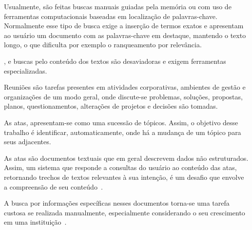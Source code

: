 






Usualmente, são feitas buscas manuais guiadas pela memória ou com uso de ferramentas computacionais baseadas em localização de palavras-chave. Normalmente esse tipo de busca exige a inserção de termos exatos e apresentam ao usuário um documento com as palavras-chave em destaque, mantendo o texto longo, o que dificulta por exemplo o ranqueamento por relevância. 


, e buscas pelo conteúdo dos textos são desaviadoras e exigem ferramentas especializadas.


Reuniões são tarefas presentes em atividades corporativas, ambientes de gestão e organizações de um modo geral, onde discute-se problemas, soluções, propostas, planos, questionamentos, alterações de projetos e decisões são tomadas. 



As atas, apresentam-se como uma sucessão de tópicos. Assim, o objetivo desse trabalho é identificar, automaticamente, onde há a mudança de um tópico para seus adjacentes.




As atas são documentos textuais que em geral descrevem dados não estruturados. Assim, um sistema que responde a consultas do usuário ao conteúdo das atas, retornando trechos de textos relevantes à sua intenção, é um desafio que envolve a compreensão de seu conteúdo~\cite{Bokaei2015}. 



A busca por informações específicas nesses documentos torna-se uma tarefa custosa se realizada manualmente, especialmente considerando o seu crescimento em uma instituição~\cite{Lee2011, Masakazu2013, Miriam2013}.





